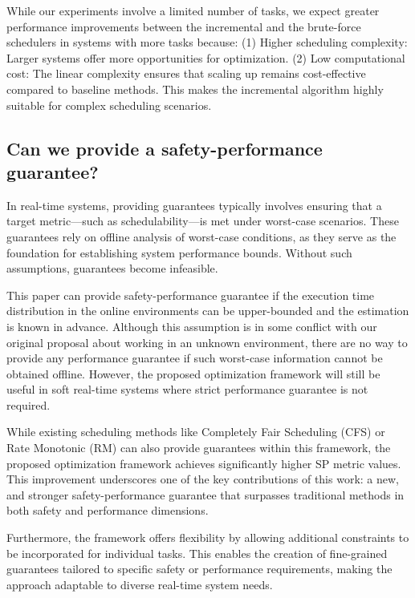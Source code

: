 While our experiments involve a limited number of tasks, we expect greater performance improvements between the incremental and the brute-force schedulers in systems with more tasks because:
(1) Higher scheduling complexity: Larger systems offer more opportunities for optimization.
(2) Low computational cost: The linear complexity ensures that scaling up remains cost-effective compared to baseline methods.
This makes the incremental algorithm highly suitable for complex scheduling scenarios.


    \subsection{Can we provide a safety-performance guarantee?}


    In real-time systems, providing guarantees typically involves ensuring that a target metric—such as schedulability—is met under worst-case scenarios. These guarantees rely on offline analysis of worst-case conditions, as they serve as the foundation for establishing system performance bounds. Without such assumptions, guarantees become infeasible.

    This paper can provide safety-performance guarantee if the execution time distribution in the online environments can be upper-bounded and the estimation is known in advance.
    Although this assumption is in some conflict with our original proposal about working in an unknown environment, there are no way to provide any performance guarantee if such worst-case information cannot be obtained offline.
    However, the proposed optimization framework will still be useful in soft real-time systems where strict performance guarantee is not required.

    While existing scheduling methods like Completely Fair Scheduling (CFS) or Rate Monotonic (RM) can also provide guarantees within this framework, the proposed optimization framework achieves significantly higher SP metric values. This improvement underscores one of the key contributions of this work: a new, and stronger safety-performance guarantee that surpasses traditional methods in both safety and performance dimensions.

    Furthermore, the framework offers flexibility by allowing additional constraints to be incorporated for individual tasks. This enables the creation of fine-grained guarantees tailored to specific safety or performance requirements, making the approach adaptable to diverse real-time system needs.
